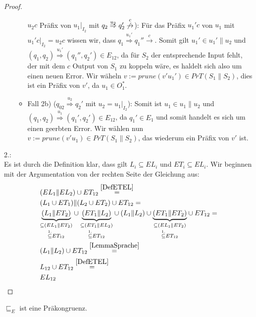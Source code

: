 \begin{proof}
\begin{itemize}
\begin{itemize}
        $u_2c$ Präfix von $u_1|_{I_2}$ mit $q_2 \overset{u_2}{\Rightarrow} q_2'
        \overset{c}{\not{\hspace{-0.1cm}\rightarrow}}$): Für das Präfix $u_1'c$
        von $u_1$ mit $u_1'c|_{I_2}=u_2c$ wissen wir, dass $q_1
        \overset{u_1'}{\Rightarrow} q_1'' \overset{c}{\rightarrow}$. Somit gilt
        $u_1'\in u_1'\|u_2$ und $(q_1,q_2) \overset{u_1'}{\Rightarrow}
        (q_1'',q_2')\in E_{12}$, da für $S_2$ der entsprechende Input fehlt,
        der mit dem $c$ Output von $S_1$ zu koppeln wäre, es haldelt sich also
        um einen neuen Error. Wir wäheln $v:=prune(v'u_1')\in PrT(S_1\| S_2)$,
        dies ist ein Präfix von $v'$, da $u_1\in O_1^*$.
      \item Fall 2b) ($q_{02} \overset{u_2}{\Rightarrow} q_2'$ mit
        $u_2=u_1|_{I_2}$): Somit ist $u_1\in u_1\|u_2$ und $(q_1,q_2)
        \overset{u_1}{\Rightarrow} (q_1',q_2')\in E_{12}$, da $q_1'\in E_1$ und
        somit handelt es sich um einen geerbten Error. Wir wählen nun $v:=prune
        (v'u_1)\in PrT(S_1\|S_2)$, das wiederum ein Präfix von $v'$ ist.
    \end{itemize}
  \end{itemize}

  2.:\\
  Es ist durch die Definition klar, dass gilt $L_i\subseteq EL_i$ und
  $ET_i\subseteq EL_i$. Wir beginnen mit der Argumentation von der rechten
  Seite der Gleichung aus:
  \begin{align*}
    &(EL_1\| EL_2)\cup ET_{12}\overset{\ref{DefETEL}}{=}\\
    &(L_1\cup ET_1)\|(L_2\cup ET_2)\cup ET_{12}=\\
    &\underset{\overset{1.}{\subseteq} ET_{12}}{\underset{\subseteq
    (EL_1\|ET_2)}{\underbrace{(L_1\|ET_2)}}} \cup
    \underset{\overset{1.}{\subseteq} ET_{12}}{\underset{\subseteq
    (ET_1\|EL_2)}{\underbrace{(ET_1\|L_2)}}} \cup
    (L_1\|L_2) \cup \underset{\overset{1.}{\subseteq}
    ET_{12}}{\underset{\subseteq (EL_1\|ET_2)}{\underbrace{(ET_1\|ET_2)}}} \cup
    ET_{12}=\\
    &(L_1\|L_2) \cup ET_{12}\overset{\ref{LemmaSprache}}{=}\\
    &L_{12}\cup ET_{12}\overset{\ref{DefETEL}}{=}\\
    &EL_{12}
  \end{align*}
\end{proof}

\begin{kor}
  \label{korPraekongruenz}
  $\sqsubseteq _E$ ist eine Präkongruenz.
\end{kor}

